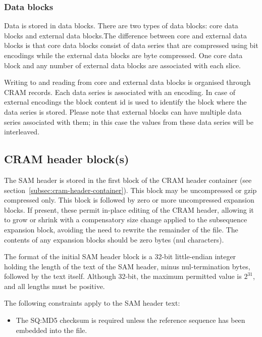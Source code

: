 \documentclass[a4paper]{article}
\begin{document}
\subsubsection*{Data blocks}

Data is stored in data blocks. There are two types of data blocks: core data blocks 
and external data blocks.The difference between core and external data blocks is 
that core data blocks consist of data series that are compressed using bit encodings 
while the external data blocks are byte compressed. One core data block and any 
number of external data blocks are associated with each slice.

Writing to and reading from core and external data blocks is organised through 
CRAM records. Each data series is associated with an encoding. In case of external 
encodings the block content id is used to identify the block where the data series 
is stored. Please note that external blocks can have multiple data series associated 
with them; in this case the values from these data series will be interleaved. 


\subsection{\textbf{CRAM header block(s)}}
\label{subsec:header-block}

The SAM header is stored in the first block of the CRAM header container (see section~\ref{subsec:cram-header-container}).
This block may be uncompressed or gzip compressed only.
This block is followed by zero or more uncompressed expansion blocks.
If present, these permit in-place editing of the CRAM header, allowing it to grow or shrink with a compensatory size change applied to the subsequence expansion block, avoiding the need to rewrite the remainder of the file.
The contents of any expansion blocks should be zero bytes (nul characters).

The format of the initial SAM header block is a 32-bit little-endian integer holding the length of the text of the SAM header, minus nul-termination bytes, followed by the text itself.
Although 32-bit, the maximum permitted value is $2^{31}$, and all lengths must be positive.

The following constraints apply to the SAM header text: 

\begin{itemize}
\item The SQ:MD5 checksum is required unless the reference sequence has been embedded 
into the file.
\end{itemize}
\end{document}
